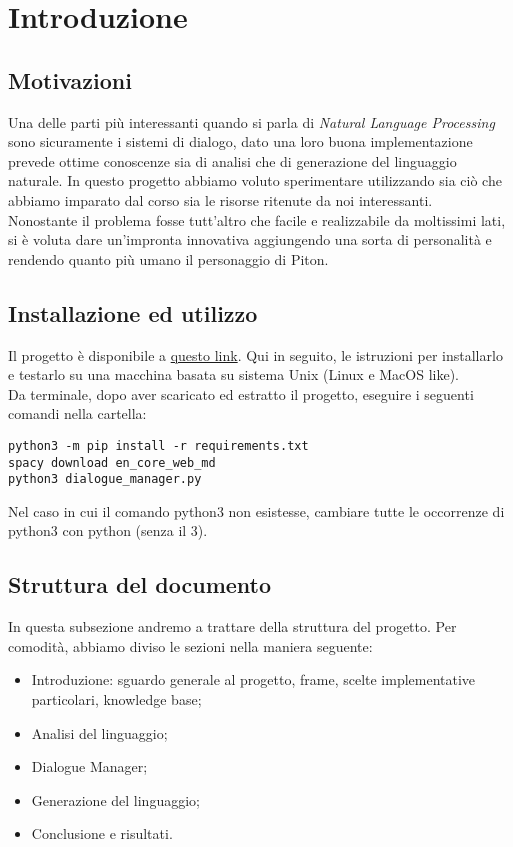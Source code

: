 \section{Introduzione}

\subsection{Motivazioni}
Una delle parti più interessanti quando si parla di \textit{Natural Language Processing} sono sicuramente i sistemi di dialogo, dato una loro buona implementazione prevede ottime conoscenze sia di analisi che di generazione del linguaggio naturale. In questo progetto abbiamo voluto sperimentare utilizzando sia ciò che abbiamo imparato dal corso sia le risorse ritenute da noi interessanti.
\\
Nonostante il problema fosse tutt'altro che facile e realizzabile da moltissimi lati, si è voluta dare un'impronta innovativa aggiungendo una sorta di personalità e rendendo quanto più umano il personaggio di Piton.

\subsection{Installazione ed utilizzo}
Il progetto è disponibile a \href{https://github.com/federicotorrielli/pitonNLG}{questo link}. Qui in seguito, le istruzioni per installarlo e testarlo su una macchina basata su sistema Unix (Linux e MacOS like).
\\
Da terminale, dopo aver scaricato ed estratto il progetto, eseguire i seguenti comandi nella cartella:
\lstset{
  language=bash,
  basicstyle=\ttfamily
}
\begin{lstlisting}
python3 -m pip install -r requirements.txt
spacy download en_core_web_md
python3 dialogue_manager.py
\end{lstlisting}
Nel caso in cui il comando python3 non esistesse, cambiare tutte le occorrenze di python3 con python (senza il 3).

\subsection{Struttura del documento}
In questa subsezione andremo a trattare della struttura del progetto. Per comodità, abbiamo diviso le sezioni nella maniera seguente:
\begin{itemize}
    \item Introduzione: sguardo generale al progetto, frame, scelte implementative particolari, knowledge base;
    \item Analisi del linguaggio;
    \item Dialogue Manager;
    \item Generazione del linguaggio;
    \item Conclusione e risultati.
\end{itemize}

